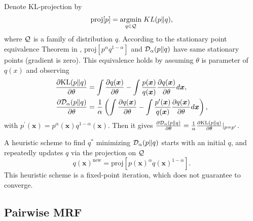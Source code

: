 Denote KL-projection by
\begin{equation}
  \text{proj}[p] = \underset{q \in \mathcal{Q}}{\operatorname{argmin}}\; KL(p\|q),
\end{equation}
where $\mathcal{Q}$ is a family of distribution $q$.
According to the stationary point equivalence Theorem in \cite{divergence-measures-and-message-passing}, $\text{proj}[p^{\alpha}q^{1- \alpha}]$ and $\mathcal{D}_{\alpha}(p\|q)$ have same stationary points (gradient is zero). This equivalence holds by assuming $\theta$ is parameter of $q(x)$ and observing
\begin{align}
  \frac{ \partial \mathrm{KL}(p\|q)}{\partial \theta} &= \int \frac{ \partial q(\bm{x})}{\partial \theta} - \int \frac{p(\bm{x})}{q(\bm{x})} \frac{ \partial q(\bm{x})}{\partial \theta} d\bm{x}, \nonumber \\
  \frac{ \partial \mathrm{\mathcal{D}_{\alpha}}(p\|q)}{\partial \theta} &= \frac{1}{\alpha} \left( \int \frac{ \partial q(\bm{x})}{\partial \theta} - \int \frac{p^{\prime}(\bm{x})}{q(\bm{x})} \frac{ \partial q(\bm{x})}{\partial \theta} d\bm{x}  \right), \nonumber
\end{align}
with $p^{\prime}(\bm{x}) = p^{\alpha}(\bm{x})q^{1-\alpha}(\bm{x})$. Then it gives $\frac{ \partial \mathrm{\mathcal{D}_{\alpha}}(p\|q)}{\partial \theta}  = \frac{1}{\alpha}\frac{ \partial \mathrm{KL}(p\|q)}{\partial \theta}|_{p=p^{\prime}}$.

A heuristic scheme to find $q^{\ast}$ minimizing $\mathcal{D}_{\alpha}(p\|q)$ starts with an initial $q$, and repeatedly updates $q$ via the projection on $\mathcal{Q}$
\begin{equation}\label{eq:fixed-point-iter}
  q(\bm{x})^{\text{new}}  = \text{proj}[p(\bm{x})^{\alpha}q(\bm{x})^{1-\alpha}].
\end{equation}
This heuristic scheme is a fixed-point iteration, which does not guarantee to converge.

\subsection{Pairwise MRF}

